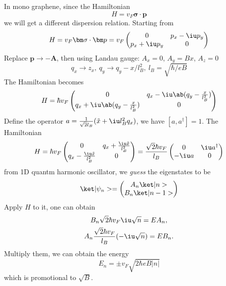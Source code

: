 In mono graphene, since the Hamiltonian
\[
  H = v_F \bm\sigma \cdot \bm p
\]
we will get a different dispersion relation.
Starting from
\begin{equation}
  H = v_F \bm \sigma \cdot \bm p = v_F
  \begin{pmatrix}
    0 & p_x - \iu p_y\\
    p_x + \iu p_y & 0
  \end{pmatrix}
\end{equation}
Replace $\bm p \to \bm - \bm A$,
then using Landau gauge: $A_x = 0$, $A_y = Bx$, $A_z = 0$
\[
  q_x \to z_x,\ q_y \to q_y - x/l_B^2,\ l_B = \sqrt{\hbar/eB}
\]
The Hamiltonian becomes
\[
  H = \hbar v_F
  \begin{pmatrix}
    0 & q_x - \iu\ab(q_y - \frac x{l_B^2})\\
    q_x + \iu\ab(q_y - \frac x{l_B^2}) & 0
  \end{pmatrix}
\]
Define the operator $a = \frac1{\sqrt2l_B}(\tilde x + \iu l_B^2 q_x)$, we have
$[a,a^\dagger] = 1$. The Hamiltonian
\[
  H = \hbar v_F
  \begin{pmatrix}
    0 & q_x + \frac{\iu\tilde x}{l_B^2}\\
    q_x - \frac{\iu\tilde x}{l_B^2} & 0
  \end{pmatrix} = \frac{\sqrt2\hbar v_F}{l_B}
  \begin{pmatrix}
    0 & \iu a^\dagger\\
    -\iu a & 0
  \end{pmatrix}
\]
from 1D quantm harmonic oscillator, we \emph{guess} the eigenstates to be
\[
  \ket|\psi_n> =
  \begin{pmatrix}
    A_n\ket|n> \\ B_n\ket|n - 1>
  \end{pmatrix}
\]
Apply $H$ to it, one can obtain
\begin{gather*}
  B_n \sqrt2\hbar v_F \iu \sqrt n = E A_n,\\
  A_n \frac{\sqrt2\hbar v_F}{l_B} (-\iu \sqrt n) = EB_n.
\end{gather*}
Multiply them, we can obtain the energy
\[
  E_n = \pm v_F \sqrt{2\hbar eB|n|}
\]
which is promotional to $\sqrt B$.